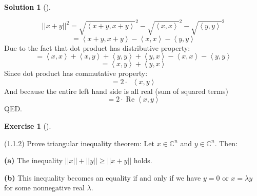 \documentclass[numbers=enddot,12pt,final,onecolumn,notitlepage]{scrartcl}
\newcounter{exer}
\newcounter{sol}
\theoremstyle{definition}
\newtheorem{exmp}[exer]{Exercise}
\newenvironment{exercise}[1][]
{\begin{exmp}[#1]\begin{leftbar}}
        {\end{leftbar}\end{exmp}}
\newtheorem{solu}[sol]{Solution}
\newenvironment{solution}[1][]
{\begin{solu}[#1]\begin{leftbar}}
        {\end{leftbar}\end{solu}}
\begin{document}
\begin{solution}
	\[
		\left\vert \left\vert x+y \right\vert \right\vert ^{2} = \sqrt{\left\langle x+y, x+y \right\rangle}^{2} -
		\sqrt{\left\langle x, x \right\rangle}^{2} -
		\sqrt{\left\langle y, y \right\rangle}^{2}
	\]
	\[
		= \left\langle x+y, x+y \right\rangle -
		\left\langle x, x \right\rangle -
		\left\langle y, y \right\rangle
	\]
	Due to the fact that dot product has distributive property:
	\[
		= \left\langle x, x \right\rangle +
		\left\langle x, y \right\rangle +
		\left\langle y, y \right\rangle +
		\left\langle y, x \right\rangle -
		\left\langle x, x \right\rangle -
		\left\langle y, y \right\rangle
	\]
	\[
		= \left\langle x, y \right\rangle +
		\left\langle y, x \right\rangle
	\]
	Since dot product has commutative property:
	\[
		= 2\cdot\operatorname*{}\left\langle x, y \right\rangle
	\]
	And because the entire left hand side is all real (sum of squared terms)
	\[
		= 2\cdot\operatorname*{Re}\left\langle x, y \right\rangle
	\]
	QED.
\end{solution}

\begin{exercise}
	\label{exe.unitary.innerprod.norm-tria} (1.1.2) Prove triangular inequality theorem:
	Let
	$x\in\mathbb{C}^{n}$ and $y\in\mathbb{C}^{n}$. Then:

	\textbf{(a)} The inequality $\left\vert \left\vert x\right\vert \right\vert
		+\left\vert \left\vert y\right\vert \right\vert \geq\left\vert \left\vert
		x+y\right\vert \right\vert $ holds.

	\textbf{(b)} This inequality becomes an equality if and only if we have $y=0$
	or $x=\lambda y$ for some nonnegative real $\lambda$.
\end{exercise}
\end{document}
